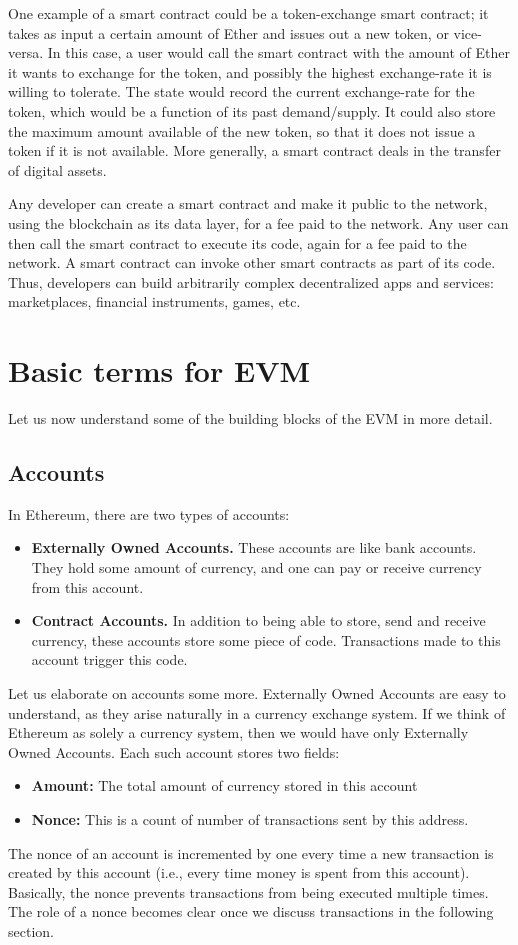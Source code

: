 \documentclass{article}
\begin{document}
One example of a smart contract could be a token-exchange smart contract; it takes as input a certain amount of Ether and issues out a new token, or vice-versa. In this case, a user would call the smart contract with the amount of Ether it wants to exchange for the token, and possibly the highest exchange-rate it is willing to tolerate. The state would record the current exchange-rate for the token, which would be a function of its past demand/supply. It could also store the maximum amount available of the new token, so that it does not issue a token if it is not available. More generally, a smart contract deals in the transfer of digital assets.

Any developer can create a smart contract and make it public to the network, using the blockchain as its data layer, for a fee paid to the network. Any user can then call the smart contract to execute its code, again for a fee paid to the network. A smart contract can invoke other smart contracts as part of its code. Thus, developers can build arbitrarily complex decentralized apps and services: marketplaces, financial instruments, games, etc.

\section*{Basic terms for EVM}
Let us now understand some of the building blocks of the EVM in more detail. 

\subsection*{Accounts}
In Ethereum, there are two types of accounts:
\begin{itemize}
    \item \textbf{Externally Owned Accounts.} These accounts are like bank accounts. They hold some amount of currency, and one can pay or receive currency from this account.
    \item \textbf{Contract Accounts.} In addition to being able to store, send and receive currency, these accounts store some piece of code. Transactions made to this account trigger this code.
\end{itemize}
Let us elaborate on accounts some more. Externally Owned Accounts are easy to understand, as they arise naturally in a currency exchange system. If we think of Ethereum as solely a currency system, then we would have only Externally Owned Accounts. Each such account stores two fields:
\begin{itemize}
    \item \textbf{Amount:} The total amount of currency stored in this account
    \item \textbf{Nonce:} This is a count of number of transactions sent by this address.
\end{itemize}
The nonce of an account is incremented by one every time a new transaction is created by this account (i.e., every time money is spent from this account). Basically, the nonce prevents transactions from being executed multiple times. The role of a nonce becomes clear once we discuss transactions in the following section.
\end{document}
